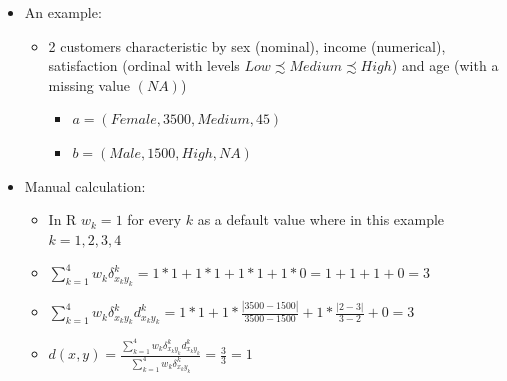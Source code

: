 \documentclass[
  ignorenonframetext,
]{beamer}
\providecommand{\tightlist}{%
  \setlength{\itemsep}{0pt}\setlength{\parskip}{0pt}}\usepackage{longtable,booktabs,array}
\begin{document}
\begin{frame}{}
\label{section-15}
\begin{itemize}
\item
  An example:

  \begin{itemize}
  \item
    2 customers characteristic by sex (nominal), income (numerical),
    satisfaction (ordinal with levels
    \(Low \precsim Medium \precsim High\)) and age (with a missing value
    \((NA)\))

    \begin{itemize}
    \tightlist
    \item
      \(a = (Female, 3500, Medium, 45)\)
    \item
      \(b = (Male, 1500, High, NA)\)
    \end{itemize}
  \end{itemize}
\item
  Manual calculation:

  \begin{itemize}
  \item
    In R \(w_k = 1\) for every \(k\) as a default value where in this
    example \(k = 1, 2, 3, 4\)
  \item
    \(\sum_{k=1}^4 w_k\delta_{x_ky_k}^k = 1*1 + 1*1 + 1*1 + 1*0 = 1 + 1 + 1 + 0 = 3\)
  \item
    \(\sum_{k=1}^4 w_k \delta_{x_ky_k}^kd_{x_ky_k}^k = 1*1 + 1*\frac{\left| 3500 - 1500 \right|}{3500 - 1500} + 1*\frac{\left| 2 - 3 \right|}{3 - 2} + 0 = 3\)
  \item
    \(d(x,y) = \frac{\sum_{k=1}^4 w_k \delta_{x_ky_k}^kd_{x_ky_k}^k}{\sum_{k=1}^4 w_k\delta_{x_ky_k}^k} = \frac{3}{3} = 1\)
  \end{itemize}
\end{itemize}
\end{frame}
\end{document}
